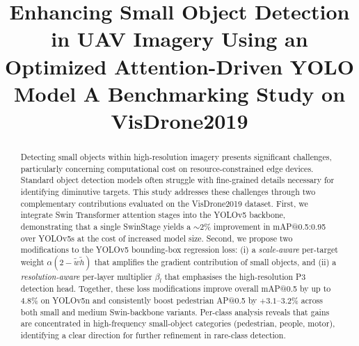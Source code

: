 \documentclass[conference]{IEEEtran}
\begin{document}
\title{Enhancing Small Object Detection in
UAV Imagery Using an Optimized
Attention-Driven YOLO Model
A Benchmarking Study on VisDrone2019
}

\author{
\and
{}
}

\maketitle

\begin{abstract}
Detecting small objects within high-resolution imagery presents significant challenges, particularly concerning computational cost on resource-constrained edge devices. Standard object detection models often struggle with fine-grained details necessary for identifying diminutive targets. This study addresses these challenges through two complementary contributions evaluated on the VisDrone2019 dataset. First, we integrate Swin Transformer attention stages into the YOLOv5 backbone, demonstrating that a single SwinStage yields a $\sim$2\% improvement in mAP@0.5:0.95 over YOLOv5s at the cost of increased model size. Second, we propose two modifications to the YOLOv5 bounding-box regression loss: (i) a \emph{scale-aware} per-target weight $\alpha(2 - \tilde{w}\tilde{h})$ that amplifies the gradient contribution of small objects, and (ii) a \emph{resolution-aware} per-layer multiplier $\beta_l$ that emphasises the high-resolution P3 detection head. Together, these loss modifications improve overall mAP@0.5 by up to 4.8\% on YOLOv5n and consistently boost pedestrian AP@0.5 by $+3.1$--$3.2\%$ across both small and medium Swin-backbone variants. Per-class analysis reveals that gains are concentrated in high-frequency small-object categories (pedestrian, people, motor), identifying a clear direction for further refinement in rare-class detection.
\end{abstract}
\end{document}
